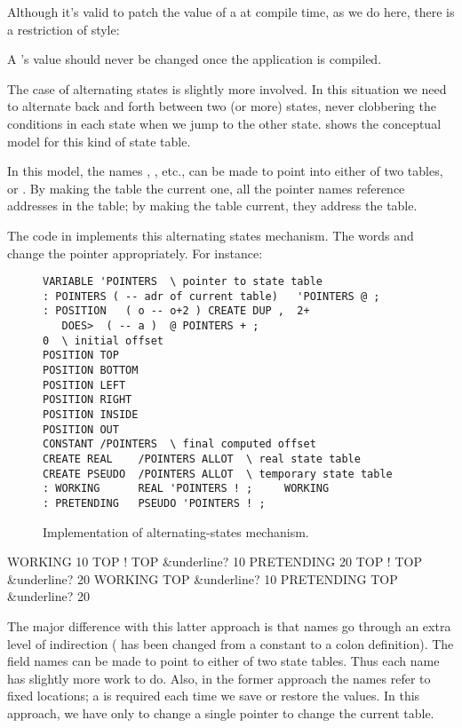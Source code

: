 Although it's valid to patch the value of a  at compile
time, as we do here, there is a restriction of style:

\begin{tip}
A 's value should never be changed once the application is
compiled.
\end{tip}
The case of alternating states is slightly more involved. In this situation
we need to alternate back and forth between two (or more) states, never
clobbering the conditions in each state when we jump to the other state.
 shows the conceptual model for this kind of state table.


\noindent In this model, the names , , etc., can
be made to point into either of two tables,  or
. By making the  table the current one, all
the pointer names reference addresses in the  table; by
making the  table current, they address the
 table.

The code in  implements this alternating states mechanism.
The words  and  change the pointer
appropriately. For instance:

\begin{figure*}[bbbt]
\caption{Implementation of alternating-states mechanism.}
\begin{center}
\begin{BVerbatim}
VARIABLE 'POINTERS  \ pointer to state table
: POINTERS ( -- adr of current table)   'POINTERS @ ;
: POSITION   ( o -- o+2 ) CREATE DUP ,  2+
   DOES>  ( -- a )  @ POINTERS + ;
0  \ initial offset
POSITION TOP
POSITION BOTTOM
POSITION LEFT
POSITION RIGHT
POSITION INSIDE
POSITION OUT
CONSTANT /POINTERS  \ final computed offset
CREATE REAL    /POINTERS ALLOT  \ real state table
CREATE PSEUDO  /POINTERS ALLOT  \ temporary state table
: WORKING      REAL 'POINTERS ! ;     WORKING
: PRETENDING   PSEUDO 'POINTERS ! ;
\end{BVerbatim}
\end{center}
\end{figure*}

\begin{Code}[commandchars=&\{\}]
WORKING
10 TOP !
TOP &underline{? 10}
PRETENDING
20 TOP !
TOP &underline{? 20}
WORKING
TOP &underline{? 10}
PRETENDING
TOP &underline{? 20}
\end{Code}
The major difference with this latter approach is that names go through
an extra level of indirection ( has been changed from a
constant to a colon definition). The field names can be made to point to
either of two state tables. Thus each name has slightly more work to do.
Also, in the former approach the names refer to fixed locations; a
 is required each time we save or restore the values. In this
approach, we have only to change a single pointer to change the current
table.%

